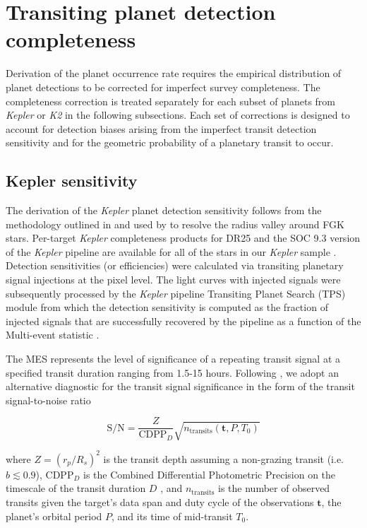 \documentclass[twocolumn]{emulateapj}
\newcommand{\kepler}[1]{\emph{Kepler}#1}
\newcommand{\ktwo}[1]{\emph{K2}#1}
\begin{document}
\section{Transiting planet detection completeness}  \label{sect:completeness}
Derivation of the planet occurrence rate requires the empirical distribution of planet detections to be corrected
for imperfect survey completeness. The completeness correction is treated separately for each subset
of planets from \kepler{} or \ktwo{} in the following subsections. Each set of corrections is designed to account
for detection biases arising from the imperfect transit detection sensitivity and for the 
geometric probability of a planetary transit to occur.

\subsection{Kepler sensitivity} \label{sect:kepsens}
The derivation of the \kepler{} planet detection sensitivity follows from the methodology outlined in
\cite{christiansen16} and used by \cite{fulton17} to resolve the radius valley around FGK stars. Per-target
\kepler{} completeness products for DR25 and the SOC 9.3 version of the \kepler{} pipeline
\citep{jenkins10} are available
for all of the stars in our \kepler{} sample \citep{burke15,burke17}. Detection sensitivities
(or efficiencies) were calculated via transiting planetary signal injections at the pixel level.
The light curves with injected signals
were subsequently processed by the \kepler{} pipeline Transiting Planet Search (TPS) module from
which the detection sensitivity is computed as the fraction of
injected signals that are successfully recovered by the pipeline as a function of the Multi-event statistic
\citep[MES;][]{christiansen15,christiansen17}.

The MES represents the level of significance of a repeating transit signal at a specified transit duration ranging
from 1.5-15 hours. Following \cite{petigura18}, we adopt an alternative diagnostic for the transit signal significance
in the form of the transit signal-to-noise ratio

\begin{equation}
  \text{S/N} = \frac{Z}{\text{CDPP}_D} \sqrt{n_{\text{transits}}(\mathbf{t},P,T_0)}  \label{eq:snr}
\end{equation}

\noindent where $Z=(r_p/R_s)^2$ is the transit depth assuming a non-grazing transit (i.e. $b\lesssim 0.9$),
CDPP$_D$ is the Combined Differential Photometric
Precision on the timescale of the transit duration $D$ \citep{koch10}, and $n_{\text{transits}}$ is the number of
observed transits given the target's data span and duty cycle
of the observations $\mathbf{t}$, the planet's orbital period $P$, and its time of mid-transit $T_0$.
\end{document}
